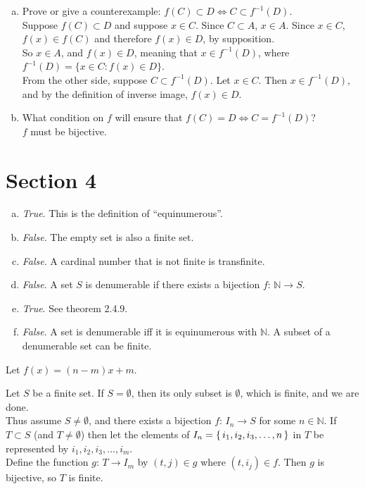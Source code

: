 \documentclass[12pt]{scrartcl} %
\begin{document}
\begin{enumerate}[(a)]
\item Prove or give a counterexample: $f(C) \subset D \iff C \subset f^{-1}(D)$. \\
Suppose $f(C) \subset D$ and suppose $x \in C$. Since $C \subset A$, $x \in A$. Since $x \in C$, $f(x) \in f(C)$ and therefore $f(x) \in D$, by supposition. \\
So $x \in A$, and $f(x) \in D$, meaning that $x \in f^{-1}(D)$, where $f^{-1}(D) = \{x \in C: f(x) \in D\}$. \\

From the other side, suppose $C \subset f^{-1}(D)$. Let $x \in C$. Then $x \in f^{-1}(D)$, and by the definition of inverse image, $f(x) \in D$.
\item What condition on $f$ will ensure that $f(C) = D \iff C = f^{-1}(D)$? \\
$f$ must be bijective.

\end{enumerate}
\section{Section 4}

\begin{enumerate}[(a)]
\item \emph{True}. This is the definition of ``equinumerous''.
\item \emph{False}. The empty set is also a finite set.
\item \emph{False}. A cardinal number that is not finite is transfinite.
\item \emph{False}. A set $S$ is denumerable if there exists a bijection $f: \, \mathbb{N}\rightarrow S$.
\item \emph{True}. See theorem 2.4.9.
\item \emph{False}. A set is denumerable iff it is equinumerous with $\mathbb{N}$. A subset of a denumerable set can be finite.
\end{enumerate}

Let $f(x)=(n-m)x + m$.

Let $S$ be a finite set. If $S = \emptyset$, then its only subset is $\emptyset$, which is finite, and we are done. \\
Thus assume $S \neq \emptyset$, and there exists a bijection $f: \, I_n \rightarrow S$ for some $n \in \mathbb{N}$. If $T \subset S$ (and $T \neq \emptyset$) then let the elements of $I_n = \set{i_1, i_2, i_3, \ldots, n}$  in $T$ be represented by $i_1, i_2, i_3, \ldots, i_m$. \\
Define the function $g: \, T \rightarrow I_m$ by $(t, j) \in g$ where $(t, i_j) \in f$. Then $g$ is bijective, so $T$ is finite.
\end{document}
